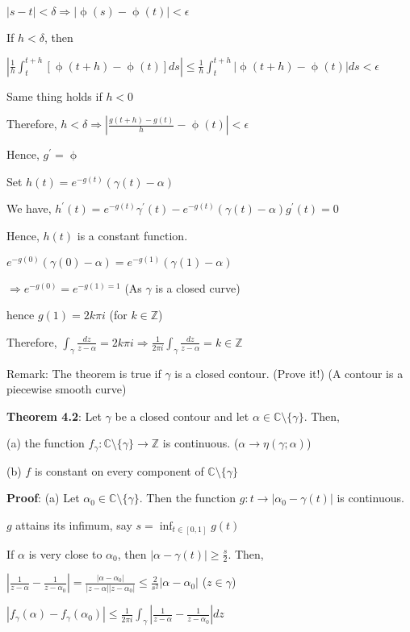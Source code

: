 \documentclass{article}
\begin{document}
\begin{flushleft}
$|s-t|<\delta \Rightarrow |\upphi(s)-\upphi(t)|<\epsilon$ 

If $h<\delta$, then

$|\frac{1}{h}\int_{t}^{t+h}[\upphi(t+h)-\upphi(t)]ds|\leq \frac{1}{h}\int_{t}^{t+h}|\upphi(t+h)-\upphi(t)| ds<\epsilon$

Same thing holds if $h<0$

Therefore, $h<\delta \Rightarrow |\frac{g(t+h)-g(t)}{h}-\upphi(t)|<\epsilon$

Hence, $g^{'}=\upphi$

Set $h(t)=e^{-g(t)}(\gamma(t)-\alpha)$

We have, $h^{'}(t)=e^{-g(t)}\gamma^{'}(t)-e^{-g(t)}(\gamma(t)-\alpha)g^{'}(t)=0$

Hence, $h(t)$ is a constant function.

$e^{-g(0)}(\gamma(0)-\alpha)=e^{-g(1)}(\gamma(1)-\alpha)$

$\Rightarrow e^{-g(0)}=e^{-g(1)=1}$ (As $\gamma$ is a closed curve)

hence $g(1)=2k\pi i$ (for $k\in \mathds{Z}$)

Therefore, $\int_{\gamma}^{}\frac{dz}{z-\alpha}=2k\pi i\Rightarrow \frac{1}{2\pi i}\int_{\gamma}^{}\frac{dz}{z-\alpha}=k\in \mathds{Z}$ 

Remark: The theorem is true if $\gamma$ is a closed contour. (Prove it!) (A contour is a piecewise smooth curve)

\textbf{Theorem 4.2}: Let $\gamma$ be a closed contour and let $\alpha \in \mathds{C}\setminus \{\gamma\}$. Then,

(a) the function $f_{\gamma}: \mathds{C}\setminus \{\gamma\}\rightarrow \mathds{Z}$ is continuous. ($\alpha \rightarrow \eta(\gamma;\alpha)$)

(b) $f$ is constant on every component of $\mathds{C}\setminus \{\gamma\}$

\textbf{Proof}: (a) Let $\alpha_0 \in \mathds{C}\setminus \{\gamma\}$. Then the function $g:t \rightarrow |\alpha_0-\gamma(t)|$ is continuous.

$g$ attains its infimum, say $s=\inf_{t\in[0,1]} g(t)$

If $\alpha$ is very close to $\alpha_0$, then $|\alpha-\gamma(t)|\geq \frac{s}{2}$. Then,

$|\frac{1}{z-\alpha}-\frac{1}{z-\alpha_0}|=\frac{|\alpha-\alpha_0|}{|z-\alpha||z-\alpha_0|}\leq \frac{2}{s^2}|\alpha-\alpha_0|$ ($z\in \gamma$)

$|f_{\gamma}(\alpha)-f_{\gamma}(\alpha_0)|\leq \frac{1}{2\pi i} \int_{\gamma}^{}|\frac{1}{z-\alpha}-\frac{1}{z-\alpha_0}| dz$


\end{flushleft}
\end{document}
